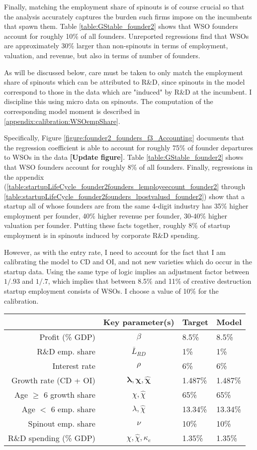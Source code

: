 \documentclass[11pt,english]{article}
\begin{document}
Finally, matching the employment share of spinouts is of course crucial so that the analysis accurately captures the burden such firms impose on the incumbents that spawn them. Table \ref{table:GStable_founder2} shows that WSO founders account for roughly 10\% of all founders. Unreported regressions find that WSOs are approximately 30\% larger than non-spinouts in terms of employment, valuation, and revenue, but also in terms of number of founders. 

As will be discussed below, care must be taken to only match the employment share of spinouts which can be attributed to R\&D, since spinouts in the model correspond to those in the data which are "induced" by R\&D at the incumbent. I discipline this using micro data on spinouts. The computation of the corresponding model moment is described in \ref{appendix:calibration:WSOempShare}.

Specifically, Figure \ref{figure:founder2_founders_f3_Accounting} documents that the regression coefficient is able to account for roughly 75\% of founder departures to WSOs in the data \textbf{[Update figure]}. Table \ref{table:GStable_founder2} shows that WSO founders account for roughly 8\% of all founders. Finally, regressions in the appendix (\ref{table:startupLifeCycle_founder2founders_lemployeecount_founder2} through \ref{table:startupLifeCycle_founder2founders_lpostvalusd_founder2}) show that a startup all of whose founders are from the same 4-digit industry has 35\% higher employment per founder, 40\% higher revenue per founder, 30-40\% higher valuation per founder. Putting these facts together, roughly 8\% of startup employment is in spinouts induced by corporate R\&D spending. 

However, as with the entry rate, I need to account for the fact that I am calibrating the model to CD and OI, and not new varieties which do occur in the startup data. Using the same type of logic implies an adjustment factor between $1/.93$ and $1/.7$, which implies that between 8.5\% and 11\% of creative destruction startup employment consists of WSOs. I choose a value of 10\% for the calibration.

\begin{table}[]
	\centering
	\label{calibration_targets}
	\begin{tabular}{rcll}
		\toprule \toprule
		& Key parameter(s) & Target & Model \tabularnewline
		\midrule
		Profit (\% GDP) & $\beta$ & 8.5\% & 8.5\% 
		\tabularnewline
		R\&D emp. share & $\bar{L}_{RD}$ & 1\% & 1\% 
		\tabularnewline
		Interest rate & $\rho$ & 6\% & 6\% 
		\tabularnewline
		Growth rate (CD + OI) & $\mathbf{\lambda, \chi, \hat{\chi}}$ & 1.487\% & 1.487\%
		\tabularnewline		
		Age $\ge$ 6 growth share & $\chi, \hat{\chi}$  & 65\% & 65\%
		\tabularnewline
		Age $<$ 6 emp. share  & $\lambda, \hat{\chi}$ & 13.34\% & 13.34\%
		\tabularnewline
		Spinout emp. share &$\nu$  & 10\% & 10\%
		\tabularnewline
		R\&D spending (\% GDP) & $\chi, \hat{\chi}, \kappa_e$  & 1.35\% & 1.35\%
		\tabularnewline
		\bottomrule
	\end{tabular}
\end{table}
\end{document}
